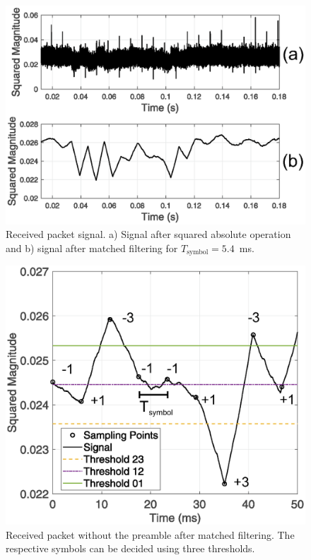 \documentclass[journal]{IEEEtran}
\begin{document}
\begin{figure}[t]
\centering
\includegraphics[width=1\columnwidth]{Figures/Fig10.eps}
\caption{Received packet signal. a) Signal after squared absolute operation and b)  signal after matched filtering for
$T_\text{symbol}=5.4$~ms.}
\label{fig:rec_packet}
\end{figure}


\begin{figure}[t]
\centering
\includegraphics[width=0.9\columnwidth]{Figures/Fig11.eps}
\caption{Received packet without the preamble after matched filtering.  The respective symbols can be decided using three thresholds.}
\label{fig:thresholds}
\end{figure}
%
\end{document}
